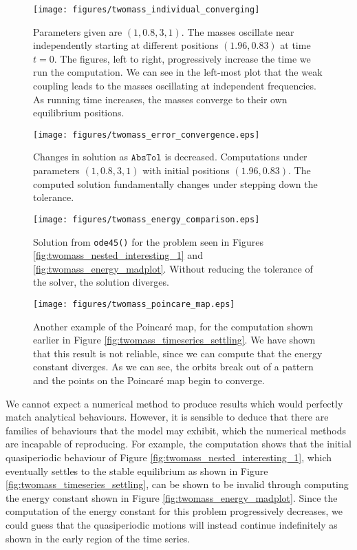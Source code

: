\documentclass{report}
\begin{document}
\begin{figure}[h!]
	\centering
	\texttt{[image: figures/twomass\_individual\_converging]}
	\caption{
		Parameters given are \((1, 0.8, 3, 1)\). The masses oscillate near independently starting at different positions $(1.96, 0.83)$ at time $t=0$.
		The figures, left to right, progressively increase the time we run the computation.
		We can see in the left-most plot that the weak coupling leads to the masses oscillating at independent frequencies.
		As running time increases, the masses converge to their own equilibrium positions.
	}
	\label{fig:twomass_independent}
\end{figure}

\begin{figure}[h!]
	\centering
	\texttt{[image: figures/twomass\_error\_convergence.eps]}
	\caption{
		Changes in solution as \(\mathtt{AbsTol}\) is decreased.
		Computations under parameters \((1, 0.8, 3, 1)\) with initial positions \((1.96, 0.83)\).
		The computed solution fundamentally changes under stepping down the tolerance.   
	}
	\label{fig:twomass_stepping_tolerance}
\end{figure}

\begin{figure}[h!]
	\centering
	\texttt{[image: figures/twomass\_energy\_comparison.eps]}
	\caption{
		Solution from \texttt{ode45()} for the problem seen in Figures \ref{fig:twomass_nested_interesting_1} and \ref{fig:twomass_energy_madplot}.
		Without reducing the tolerance of the solver,
		the solution diverges.
	}
	\label{fig:twomass_energy_mistake}
\end{figure}

\begin{figure}[h!]
	\centering
	\texttt{[image: figures/twomass\_poincare\_map.eps]}
	\caption{
		Another example of the Poincar\'e map, for the computation shown earlier in Figure \ref{fig:twomass_timeseries_settling}.
		We have shown that this result is not reliable, since we can compute that the energy constant diverges.
		As we can see, the orbits break out of a pattern and the points on the Poincar\'e map begin to converge.
	}
	\label{fig:twomass_poincare_bad}
\end{figure}

We cannot expect a numerical method to produce results which would perfectly match analytical behaviours.
However, it is sensible to deduce that there are families of behaviours that the model may exhibit,
which the numerical methods are incapable of reproducing.
For example, the computation shows that the initial quasiperiodic behaviour of Figure \ref{fig:twomass_nested_interesting_1},
which eventually settles to the stable equilibrium as shown in Figure \ref{fig:twomass_timeseries_settling},
can be shown to be invalid through computing the energy constant shown in Figure \ref{fig:twomass_energy_madplot}.
Since the computation of the energy constant for this problem progressively decreases,
we could guess that the quasiperiodic motions will instead continue indefinitely as shown in the early region of the time series.
\end{document}

